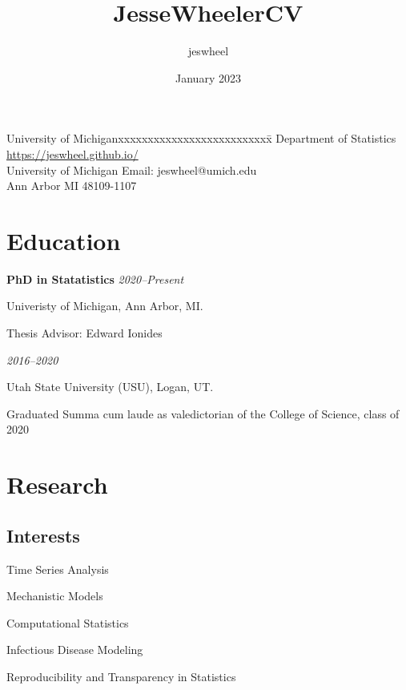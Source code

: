\documentclass[11pt] {article}
\title{JesseWheelerCV}
\author{jeswheel }
\date{January 2023}
\newenvironment {interests}
                {
                 \begin{list}{}
                 {\setlength{\labelwidth}{0mm}
                  \setlength{\leftmargin}{8mm}
                  \setlength{\itemindent}{-3mm}
                  \setlength{\labelsep}{0mm}
                  \setlength{\parsep}{0.1 ex}
                  \setlength{\itemsep}{1pt}
      \setlength{\topsep}{0.15cm}}} %
   {\end{list}}
\begin{document}
\thispagestyle{empty}  %

\rule{0mm}{1mm}
\vspace{-20mm}


\vspace{1mm}

\rule{0mm}{1mm}


\begin{tabbing}
University of Michiganxxxxxxxxxxxxxxxxxxxxxxxxxx\= \kill
Department of Statistics \>  %
{\url{https://jeswheel.github.io/}}
\\
University of Michigan\> %
Email: {jeswheel@umich.edu}
\\
Ann Arbor MI 48109-1107 \>
\end{tabbing}

\section*{Education}

{\bf PhD in Statatistics} \hfill {\textit{2020--Present}}

Univeristy of Michigan, Ann Arbor, MI.

Thesis Advisor: Edward Ionides

 \hfill  {\textit{2016--2020}}

Utah State University (USU), Logan, UT.

Graduated Summa cum laude as valedictorian of the College of Science, class of 2020

\section*{Research}
\subsection*{Interests}
\begin{interests}
    \item Time Series Analysis
    \item Mechanistic Models
    \item Computational Statistics
    \item Infectious Disease Modeling
    \item Reproducibility and Transparency in Statistics

\end{interests}
\end{document}
